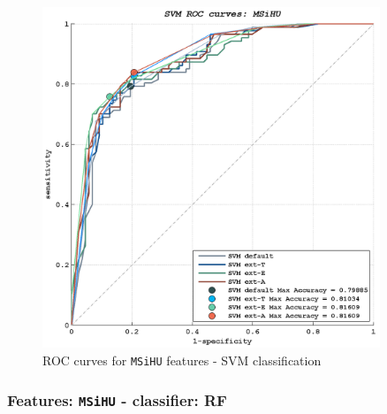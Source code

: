 
\begin{figure}[!htb]
  \centering
    \includegraphics[width=0.90\textwidth]{./images/Ch6/Fig3/SVM_ROC_MSiHU_crop.png}
    \caption{ROC curves for \texttt{MSiHU} features - SVM classification}
    \label{ch6:fig3}
\end{figure}



\vspace{0.5cm}


\subsubsection{Features: \texttt{MSiHU} - classifier: RF}

